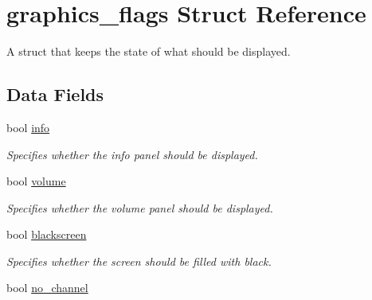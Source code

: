 \hypertarget{structgraphics__flags}{}\section{graphics\+\_\+flags Struct Reference}
\label{structgraphics__flags}


A struct that keeps the state of what should be displayed.  


\subsection*{Data Fields}
\begin{DoxyCompactItemize}
\item 
bool \hyperlink{structgraphics__flags_a8c60d4b825e87dbc322912b94395285b}{info}\hypertarget{structgraphics__flags_a8c60d4b825e87dbc322912b94395285b}{}\label{structgraphics__flags_a8c60d4b825e87dbc322912b94395285b}

\begin{DoxyCompactList}\small\item\em Specifies whether the info panel should be displayed. \end{DoxyCompactList}\item 
bool \hyperlink{structgraphics__flags_aa00a1018a3820d20a55a36da5b21e966}{volume}\hypertarget{structgraphics__flags_aa00a1018a3820d20a55a36da5b21e966}{}\label{structgraphics__flags_aa00a1018a3820d20a55a36da5b21e966}

\begin{DoxyCompactList}\small\item\em Specifies whether the volume panel should be displayed. \end{DoxyCompactList}\item 
bool \hyperlink{structgraphics__flags_a499f89ea543aef799513d071bff759b6}{blackscreen}\hypertarget{structgraphics__flags_a499f89ea543aef799513d071bff759b6}{}\label{structgraphics__flags_a499f89ea543aef799513d071bff759b6}

\begin{DoxyCompactList}\small\item\em Specifies whether the screen should be filled with black. \end{DoxyCompactList}\item 
bool \hyperlink{structgraphics__flags_afe0faa55883d9f711190fe31fa4b189f}{no\+\_\+channel}\hypertarget{structgraphics__flags_afe0faa55883d9f711190fe31fa4b189f}{}\label{structgraphics__flags_afe0faa55883d9f711190fe31fa4b189f}


\end{DoxyCompactItemize}
